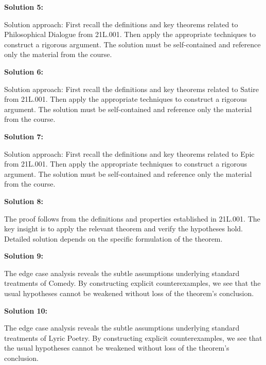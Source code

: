 \documentclass[12pt,a4paper]{exam}
\begin{document}
\vspace{0.5cm}

\textbf{Solution 5:}

Solution approach: First recall the definitions and key theorems related to Philosophical Dialogue from 21L.001. Then apply the appropriate techniques to construct a rigorous argument. The solution must be self-contained and reference only the material from the course.

\vspace{0.5cm}

\textbf{Solution 6:}

Solution approach: First recall the definitions and key theorems related to Satire from 21L.001. Then apply the appropriate techniques to construct a rigorous argument. The solution must be self-contained and reference only the material from the course.

\vspace{0.5cm}

\textbf{Solution 7:}

Solution approach: First recall the definitions and key theorems related to Epic from 21L.001. Then apply the appropriate techniques to construct a rigorous argument. The solution must be self-contained and reference only the material from the course.

\vspace{0.5cm}

\textbf{Solution 8:}

The proof follows from the definitions and properties established in 21L.001. The key insight is to apply the relevant theorem and verify the hypotheses hold. Detailed solution depends on the specific formulation of the theorem.

\vspace{0.5cm}

\textbf{Solution 9:}

The edge case analysis reveals the subtle assumptions underlying standard treatments of Comedy. By constructing explicit counterexamples, we see that the usual hypotheses cannot be weakened without loss of the theorem's conclusion.

\vspace{0.5cm}

\textbf{Solution 10:}

The edge case analysis reveals the subtle assumptions underlying standard treatments of Lyric Poetry. By constructing explicit counterexamples, we see that the usual hypotheses cannot be weakened without loss of the theorem's conclusion.
\end{document}

